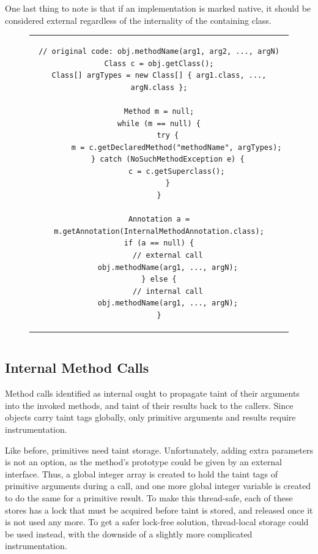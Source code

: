 \documentclass[12pt,twoside,notitlepage]{report}
\begin{document}
One last thing to note is that if an implementation is marked native, it should be considered external regardless of the internality of the containing class.

\begin{figure}[h]
	\centering
	\begin{tabular}{c}
	\begin{lstlisting}
// original code: obj.methodName(arg1, arg2, ..., argN)
Class c = obj.getClass();
Class[] argTypes = new Class[] { arg1.class, ..., argN.class };

Method m = null;
while (m == null) {
	try {
 		m = c.getDeclaredMethod("methodName", argTypes);
 	} catch (NoSuchMethodException e) {
 		c = c.getSuperclass();
 	}
}

Annotation a = m.getAnnotation(InternalMethodAnnotation.class);
if (a == null) {
	// external call
	obj.methodName(arg1, ..., argN);
} else {
	// internal call
	obj.methodName(arg1, ..., argN);
}
	\end{lstlisting}
	\end{tabular}
	\begin{lstlisting}[caption={Destination-deciding instrumentation for non-public methods},
	                   label={listing:TaintPropagation_MethodCall_DestDecidability_NonPublic}]
	\end{lstlisting}
\end{figure}

\subsection{Internal Method Calls}
\label{section:TaintPropagation_MethodCalls_Internal}

Method calls identified as internal ought to propagate taint of their arguments into the invoked methods, and taint of their results back to the callers. Since objects carry taint tags globally, only primitive arguments and results require instrumentation. 

Like before, primitives need taint storage. Unfortunately, adding extra parameters is not an option, as the method's prototype could be given by an external interface. Thus, a global integer array is created to hold the taint tags of primitive arguments during a call, and one more global integer variable is created to do the same for a primitive result. To make this thread-safe, each of these stores has a lock that must be acquired before taint is stored, and released once it is not used any more. To get a safer lock-free solution, thread-local storage could be used instead, with the downside of a slightly more complicated instrumentation.
\end{document}
